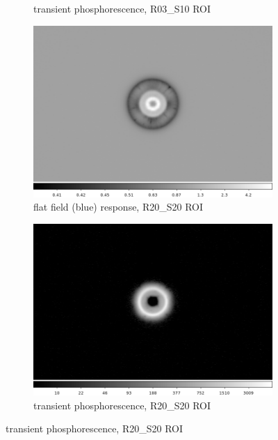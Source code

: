 \begin{figure}[!htbp]
\begin{subfigure}{0.45\textwidth}
     \caption{transient phosphorescence, R03\_S10 ROI}
     \label{subfig:phosresp_R03_S10}
\end{subfigure}
\newline
\begin{subfigure}{0.45\textwidth}
    \includegraphics[width=\textwidth]{sections/figures/phosphorescence-survey/vamp_comp_R20_S20_flatresp.png}
     \caption{flat field (blue) response, R20\_S20 ROI}
     \label{subfig:flatresp_R20_S20}
\end{subfigure}
\begin{subfigure}{0.45\textwidth}
    \includegraphics[width=\textwidth]{sections/figures/phosphorescence-survey/vamp_comp_R20_S20_phosresp.png}
     \caption{transient phosphorescence, R20\_S20 ROI}
     \label{subfig:phosresp_R20_S20}
\end{subfigure}

\end{figure}
